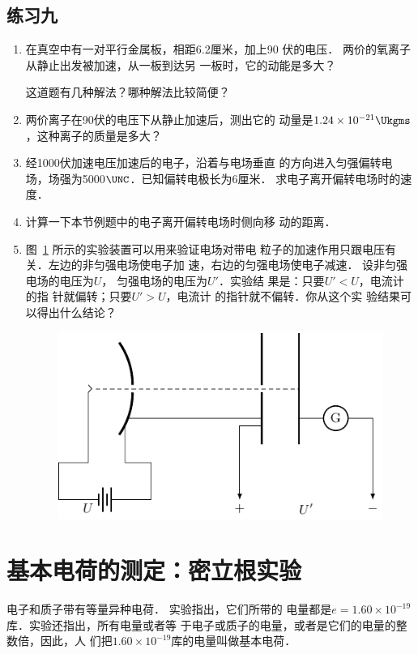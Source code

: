 \subsection*{练习九}
\begin{enumerate}
    \item 在真空中有一对平行金属板，相距6.2厘米，加上90
伏的电压．
两价的氧离子从静止出发被加速，从一板到达另
一板时，它的动能是多大？

这道题有几种解法？哪种解法比较简便？

\item 两价离子在90伏的电压下从静止加速后，测出它的
动量是$1.24\times10^{-21} \Ukgms$，这种离子的质量是多大？

\item 经1000伏加速电压加速后的电子，沿着与电场垂直
的方向进入匀强偏转电场，场强为5000$\UNC$．已知偏转电极长为6厘米．
求电子离开偏转电场时的速度．
\item 计算一下本节例题中的电子离开偏转电场时侧向移
动的距离．
\item 图~\ref{fig_B_6-30} 所示的实验装置可以用来验证电场对带电
粒子的加速作用只跟电压有关．左边的非匀强电场使电子加
速，右边的匀强电场使电子减速．
设非匀强电场的电压为$U$，
匀强电场的电压为$U'$．实验结
果是：只要$U'<U$，电流计的指
针就偏转；只要$U'>U$，电流计
的指针就不偏转．你从这个实
验结果可以得出什么结论？
\begin{figure}[htbp]
    \centering
    \includegraphics{fig/B/6-30.pdf}
    \caption{}\label{fig_B_6-30}
\end{figure}
\end{enumerate}

\section{基本电荷的测定：密立根实验}

电子和质子带有等量异种电荷．
实验指出，它们所带的
电量都是$e=1.60\times10^{-19}$库．实验还指出，所有电量或者等
于电子或质子的电量，或者是它们的电量的整数倍，因此，人
们把$1.60\times10^{-19}$库的电量叫做基本电荷．

